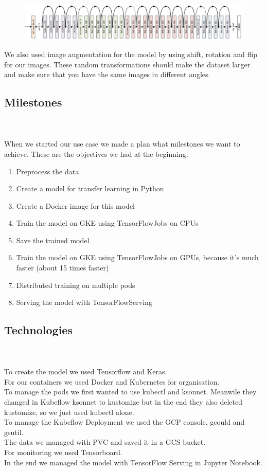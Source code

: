 \documentclass[
	12pt, %
]{fphw}
\begin{document}
\begin{figure}[H]
	\includegraphics[width=1\textwidth]{resnet.png}
\end{figure}

\noindent We also used image augmentation for the model by using shift, rotation and flip for our images. These random transformations should make the dataset larger and make sure that you have the same images in different angles.\\

\subsection*{Milestones}

\ \\  \ \\
\noindent When we started our use case we made a plan what milestones we want to achieve. These are the objectives we had at the beginning:
\begin{enumerate} 
\item Preprocess the data
\item Create a model for transfer learning in Python
\item Create a Docker image for this model
\item Train the model on GKE using TensorFlowJobs on CPUs
\item Save the trained model
\item Train the model on GKE using TensorFlowJobs on GPUs, because it's much faster (about 15 times faster)
\item Distributed training on multiple pods
\item Serving the model with TensorFlowServing
\end{enumerate}


\subsection*{Technologies}
\ \\ \ \\
To create the model we used Tensorflow and Keras.\\
 For our containers we used Docker and Kubernetes for organisation. \\
To manage the pods we first wanted to use kubectl and ksonnet. Meanwile they changed in Kubeflow ksonnet to kustomize but in the end they also deleted kustomize, so we just used kubectl alone.\\
 To manage the Kubeflow Deployment we used the GCP console, gcould and gsutil.\\
The data we managed with PVC and saved it in a GCS bucket. \\
 For monitoring we used Tensorboard. \\
 In the end we managed the model with TensorFlow Serving in Jupyter Notebook.
\ \\
\end{document}
